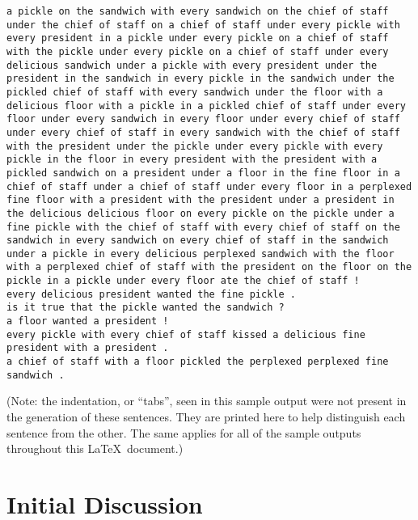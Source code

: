 \documentclass[11pt]{article}
\begin{document}
\begin{lstlisting}
a pickle on the sandwich with every sandwich on the chief of staff under the chief of staff on a chief of staff under every pickle with every president in a pickle under every pickle on a chief of staff with the pickle under every pickle on a chief of staff under every delicious sandwich under a pickle with every president under the president in the sandwich in every pickle in the sandwich under the pickled chief of staff with every sandwich under the floor with a delicious floor with a pickle in a pickled chief of staff under every floor under every sandwich in every floor under every chief of staff under every chief of staff in every sandwich with the chief of staff with the president under the pickle under every pickle with every pickle in the floor in every president with the president with a pickled sandwich on a president under a floor in the fine floor in a chief of staff under a chief of staff under every floor in a perplexed fine floor with a president with the president under a president in the delicious delicious floor on every pickle on the pickle under a fine pickle with the chief of staff with every chief of staff on the sandwich in every sandwich on every chief of staff in the sandwich under a pickle in every delicious perplexed sandwich with the floor with a perplexed chief of staff with the president on the floor on the pickle in a pickle under every floor ate the chief of staff !
every delicious president wanted the fine pickle .
is it true that the pickle wanted the sandwich ?
a floor wanted a president !
every pickle with every chief of staff kissed a delicious fine president with a president .
a chief of staff with a floor pickled the perplexed perplexed fine sandwich .
	\end{lstlisting}
(Note: the indentation, or ``tabs'', seen in this sample output were not present in the generation of these sentences. They are printed here to help distinguish each sentence from the other. The same applies for all of the sample outputs throughout this \LaTeX \ document.)
\newpage

\section{Initial Discussion}
\end{document}
